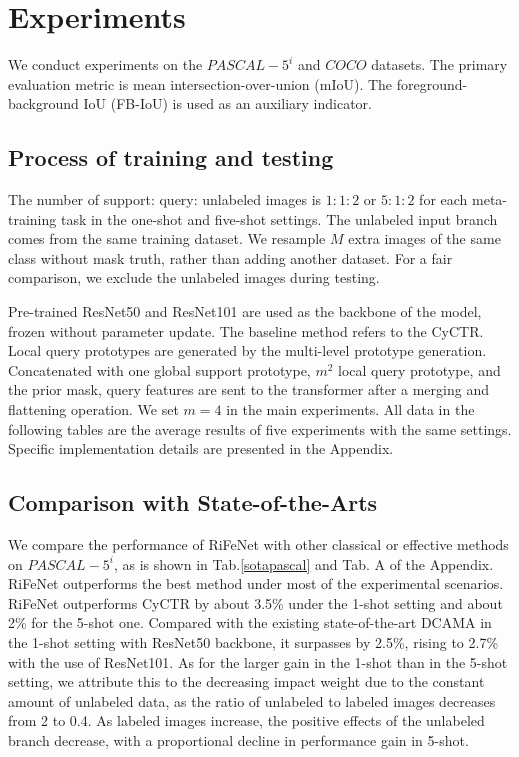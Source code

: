 \documentclass[letterpaper]{article} %
\begin{document}
\section{Experiments}
We conduct experiments on the $PASCAL-5^i$ and $COCO$ datasets. The primary evaluation metric is mean intersection-over-union (mIoU). The foreground-background IoU (FB-IoU) is used as an auxiliary indicator.

\subsection{Process of training and testing}

The number of support: query: unlabeled images is $1:1:2$ or $5:1:2$ for each meta-training task in the one-shot and five-shot settings. The unlabeled input branch comes from the same training dataset. We resample $M$ extra images of the same class without mask truth, rather than adding another dataset. For a fair comparison, we exclude the unlabeled images during testing.

Pre-trained ResNet50 and ResNet101 \cite{he2016deep} are used as the backbone of the model, frozen without parameter update. The baseline method refers to the CyCTR.
Local query prototypes are generated by the multi-level prototype generation. Concatenated with one global support prototype, $m^2$ local query prototype, and the prior mask, query features are sent to the transformer after a merging and flattening operation. We set $m=4$ in the main experiments. All data in the following tables are the average results of five experiments with the same settings. Specific implementation details are presented in the Appendix.


\subsection{Comparison with State-of-the-Arts}
We compare the performance of RiFeNet with other classical or effective methods on $PASCAL-5^i$, as is shown in Tab.\ref{sotapascal} and Tab. A of the Appendix. RiFeNet outperforms the best method under most of the experimental scenarios. RiFeNet outperforms CyCTR by about 3.5\% under the 1-shot setting and about 2\% for the 5-shot one. Compared with the existing state-of-the-art DCAMA in the 1-shot setting with ResNet50 backbone, it surpasses by 2.5\%, rising to 2.7\% with the use of ResNet101. As for the larger gain in the 1-shot than in the 5-shot setting, we attribute this to the decreasing impact weight due to the constant amount of unlabeled data, as the ratio of unlabeled to labeled images decreases from 2 to 0.4. As labeled images increase, the positive effects of the unlabeled branch decrease, with a proportional decline in performance gain in 5-shot.
\end{document}
